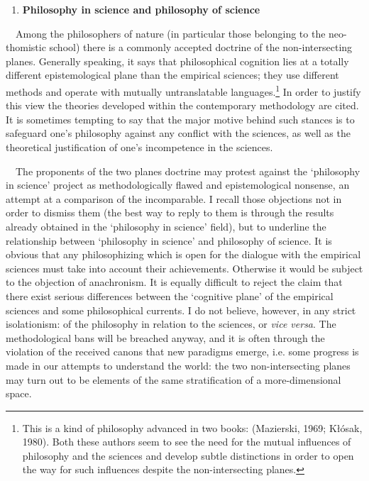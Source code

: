 \documentclass[a4paper]{article}
\begin{document}
\begin{enumerate}
\item {\bfseries
Philosophy in science and philosophy of science}
\end{enumerate}
\ \ Among the philosophers of nature (in particular those belonging to the neo-thomistic school) there is a commonly
accepted doctrine of the non-intersecting planes. Generally speaking, it says that philosophical cognition lies at a
totally different epistemological plane than the empirical sciences; they use different methods and operate with
mutually untranslatable languages.\footnote{This is a kind of philosophy advanced in two books:
\label{ref:RNDDukAXvxyUz}(Mazierski, 1969; Kłósak, 1980). Both these authors seem to see the need for the mutual
influences of philosophy and the sciences and develop subtle distinctions in order to open the way for such influences
despite the non-intersecting planes.} In order to justify this view the theories developed within the contemporary
methodology are cited. It is sometimes tempting to say that the major motive behind such stances is to safeguard one’s
philosophy against any conflict with the sciences, as well as the theoretical justification of one’s incompetence in
the sciences.

\ \ The proponents of the two planes doctrine may protest against the ‘philosophy in science’ project as
methodologically flawed and epistemological nonsense, an attempt at a comparison of the incomparable. I recall those
objections not in order to dismiss them (the best way to reply to them is through the results already obtained in the
‘philosophy in science’ field), but to underline the relationship between ‘philosophy in science’ and philosophy of
science. It is obvious that any philosophizing which is open for the dialogue with the empirical sciences must take
into account their achievements. Otherwise it would be subject to the objection of anachronism. It is equally difficult
to reject the claim that there exist serious differences between the ‘cognitive plane’ of the empirical sciences and
some philosophical currents. I do not believe, however, in any strict isolationism: of the philosophy in relation to
the sciences, or \textit{vice versa}. The methodological bans will be breached anyway, and it is often through the
violation of the received canons that new paradigms emerge, i.e. some progress is made in our attempts to understand
the world: the two non-intersecting planes may turn out to be elements of the same stratification of a more-dimensional
space.
\end{document}
